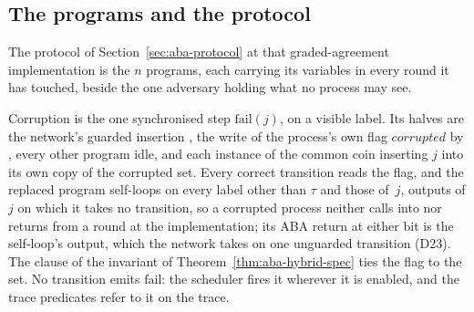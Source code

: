 \subsection{The programs and the protocol}

The protocol of Section~\ref{sec:aba-protocol} at that graded-agreement implementation is the $n$ programs, each carrying its variables in every round it has touched, beside the one adversary holding what no process may see.

Corruption is the one synchronised step $\mathrm{fail}(j)$, on a visible label.
Its halves are the network's guarded insertion , the write of the process's own flag $corrupted$ by , every other program idle, and each instance of the common coin inserting $j$ into its own copy of the corrupted set.
Every correct transition reads the flag, and the replaced program  self-loops on every label other than $\tau$ and those of \,$j$, outputs of $j$ on which it takes no transition, so a corrupted process neither calls into nor returns from a round at the implementation; its ABA return at either bit is the self-loop's output, which the network takes on one unguarded transition (D23).
The clause  of the invariant of Theorem~\ref{thm:aba-hybrid-spec} ties the flag to the set.
No transition emits $\mathrm{fail}$: the scheduler fires it wherever it is enabled, and the trace predicates refer to it on the trace.






